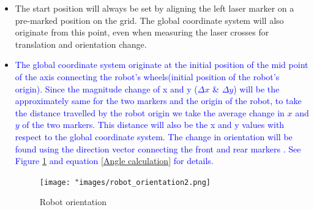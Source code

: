 \begin{itemize}
            
            \item The start position will always be set by aligning the left laser marker on a pre-marked position on the grid. The global coordinate system will also originate from this point, even when measuring the laser crosses for translation and orientation change.
            
            \item \textcolor{blue}{The global coordinate system originate at the initial position of the mid point of the axis connecting the robot's wheels(initial position of the robot's origin). Since the magnitude change of x and y ($\Delta x$  \& $\Delta y$) will be the approximately same for the two markers and the origin of the robot, to take the distance travelled by the robot origin we take the average change in $x$ and $y$ of the two markers. This distance will also be the x and y values with respect to the global coordinate system. The change in orientation will be found using the direction vector connecting the front and rear markers .  See Figure \ref{fig:Robot orientation} and equation \ref{Angle calculation} for details.} 
            
            
            \begin{figure}[!ht] 
                        \centering \texttt{[image: "images/robot\_orientation2.png]}
                        \caption{Robot orientation}
                        \label{fig:Robot orientation}
                 \end{figure}
            
            
        \end{itemize}
        
        
                
